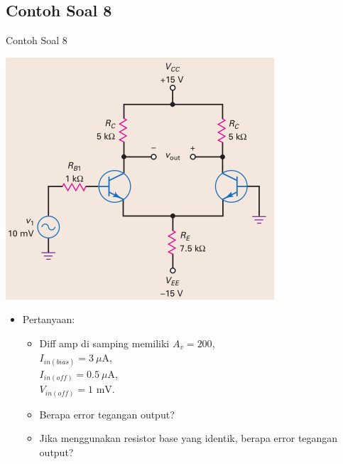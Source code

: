 \documentclass[aspectratio=169]{beamer}
\begin{document}
\subsection{Contoh Soal 8}
\begin{frame}{Contoh Soal 8}
	\begin{multicols}{2}
		\begin{center}
			\includegraphics[height=0.7\textheight]{gambar/01.latihan_soal_8}
		\end{center}
		\columnbreak
		\begin{itemize}
			\item Pertanyaan:
			\begin{itemize}
				\item Diff amp di samping memiliki $ A_v = 200 $,\\ $ I_{in(bias)} = 3~\mu\text{A} $, \\ $ I_{in(off)} = 0.5~\mu\text{A} $, \\ $ V_{in(off)} = 1 \text{ mV}$.  
				\item Berapa error tegangan output?
				\item Jika menggunakan resistor base yang identik, berapa error tegangan output?
			\end{itemize}
		\end{itemize}
	\end{multicols}
\end{frame}
\end{document}
